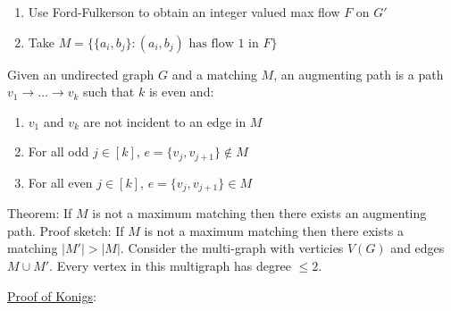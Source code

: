 \documentclass{article}
\begin{document}
\begin{enumerate}
    \item Use Ford-Fulkerson to obtain an integer valued max flow $F$ on $G'$
    \item Take $M = \{\{a_i, b_j\} : (a_i, b_j) \text{ has flow } 1 \text{ in } F\}$
\end{enumerate}
Given an undirected graph $G$ and a matching $M$, an augmenting path is a path $v_1 \rightarrow \dots \rightarrow v_k$ such that $k$ is even and: 
\begin{enumerate}
    \item $v_1$ and $v_k$ are not incident to an edge in $M$
    \item For all odd $j \in [k]$, $e = \{v_j, v_{j + 1}\} \notin M$
    \item For all even $j \in [k]$, $e = \{v_j, v_{j + 1}\} \in M$
\end{enumerate}
Theorem: If $M$ is not a maximum matching then there exists an augmenting path. Proof sketch: If $M$ is not a maximum matching then there exists a matching $|M'| > |M|$. Consider the multi-graph with verticies $V(G)$ and edges $M \cup M'$. Every vertex in this multigraph has degree $\leq 2$.  

\underline{Proof of Konigs}: \\
\end{document}

